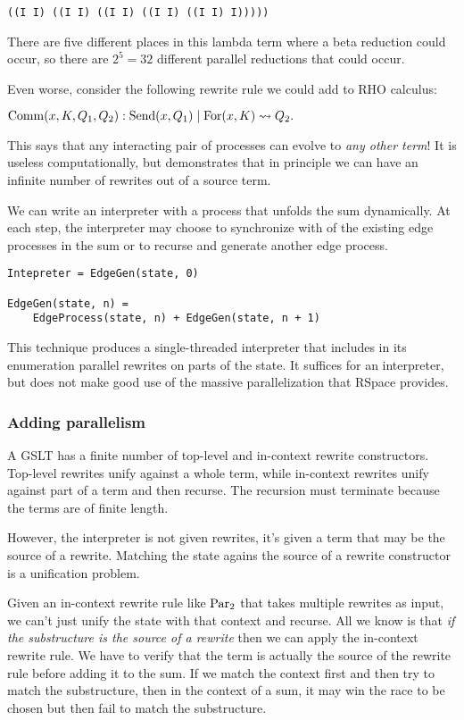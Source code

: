 \documentclass{article}
\begin{document}
\begin{verbatim}
((I I) ((I I) ((I I) ((I I) ((I I) I)))))
\end{verbatim}

There are five different places in this lambda term where a beta reduction could occur, so there are $2^5 = 32$ different parallel reductions that could occur.

Even worse, consider the following rewrite rule we could add to RHO calculus: \bigskip

\noindent ${\rm Comm}(x, K, Q_1, Q_2): {\rm Send}(x, Q_1) \;|\; {\rm For}(x, K) \leadsto Q_2.$ \bigskip

\noindent This says that any interacting pair of processes can evolve to {\em any other term}!  It is useless computationally, but demonstrates that in principle we can have an infinite number of rewrites out of a source term.

We can write an interpreter with a process that unfolds the sum dynamically.  At each step, the interpreter may choose to synchronize with of the existing edge processes in the sum or to recurse and generate another edge process.

\begin{verbatim}
Intepreter = EdgeGen(state, 0)

EdgeGen(state, n) =
    EdgeProcess(state, n) + EdgeGen(state, n + 1)
\end{verbatim}

This technique produces a single-threaded interpreter that includes in its enumeration parallel rewrites on parts of the state.  It suffices for an interpreter, but does not make good use of the massive parallelization that RSpace provides.

\subsubsection{Adding parallelism}

A GSLT has a finite number of top-level and in-context rewrite constructors.  Top-level rewrites unify against a whole term, while in-context rewrites unify against part of a term and then recurse.  The recursion must terminate because the terms are of finite length.

However, the interpreter is not given rewrites, it's given a term that may be the source of a rewrite.  Matching the state agains the source of a rewrite constructor is a unification problem.

Given an in-context rewrite rule like ${\rm Par}_2$ that takes multiple rewrites as input, we can't just unify the state with that context and recurse.  All we know is that {\em if the substructure is the source of a rewrite} then we can apply the in-context rewrite rule.  We have to verify that the term is actually the source of the rewrite rule before adding it to the sum.  If we match the context first and then try to match the substructure, then in the context of a sum, it may win the race to be chosen but then fail to match the substructure.
\end{document}
